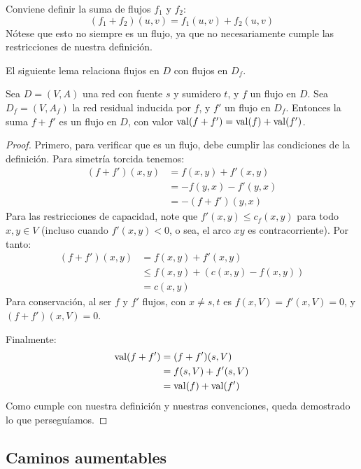   Conviene definir la suma de flujos \(f_1\) y \(f_2\):
  \begin{equation*}
    (f_1 + f_2)(u, v) = f_1 (u, v) + f_2 (u, v)
  \end{equation*}
  Nótese que esto no siempre es un flujo,
  ya que no necesariamente
  cumple las restricciones de nuestra definición.

  El siguiente lema relaciona flujos en \(D\) con flujos en \(D_f\).
  \begin{lemma}
    \label{lem:suma-flujos}
    Sea \(D = (V, A)\) una red con fuente \(s\) y sumidero \(t\),
    y \(f\) un flujo en \(D\).
    Sea \(D_f = (V, A_f)\) la red residual inducida por \(f\),
    y \(f'\) un flujo en \(D_f\).
    Entonces la suma \(f + f'\) es un flujo en \(D\),
    con valor \(\operatorname{val}(f + f') = \operatorname{val}(f) + \operatorname{val}(f')\).
  \end{lemma}
  \begin{proof}
    Primero,
    para verificar que es un flujo,
    debe cumplir las condiciones de la definición.
    Para simetría torcida tenemos:
    \begin{align*}
      (f + f')(x, y)
	&= f(x, y) + f' (x, y) \\
	&= -f(y, x) - f' (y, x) \\
	&= - (f + f')(y, x)
    \end{align*}
    Para las restricciones de capacidad,
    note que \(f' (x, y) \le c_f (x, y)\) para todo \(x, y \in V\)
    (incluso cuando \(f'(x, y) < 0\),
     o sea,
     el arco \(x y\) es contracorriente).
    Por tanto:
    \begin{align*}
      (f + f')(x, y)
	&= f(x, y) + f' (x, y) \\
	&\le f(x, y) + (c(x, y) - f(x, y)) \\
	&= c(x, y)
    \end{align*}
    Para conservación,
    al ser \(f\) y \(f'\) flujos,
    con \(x \ne s, t\) es \(f(x, V) = f'(x, V) = 0\),
    y \((f + f')(x, V) = 0\).

    Finalmente:
    \begin{align*}
      \operatorname{val}(f + f')
	&= (f + f')(s, V) \\
	&= f(s, V) + f' (s, V) \\
	&= \operatorname{val}(f) + \operatorname{val}(f')
    \end{align*}
    Como cumple con nuestra definición y nuestras convenciones,
    queda demostrado lo que perseguíamos.
  \end{proof}

\subsection{Caminos aumentables}
\label{sec:caminos-aumentables}

